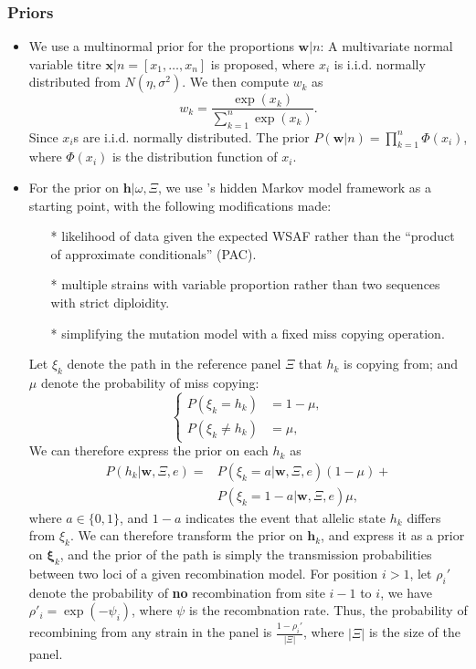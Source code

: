 \documentclass{bioinfo}
\begin{document}
\subsubsection{Priors}\label{sec:prior}
\begin{itemize}
\item We use a multinormal prior for the proportions $\mathbf{w}|n$: A multivariate normal variable titre ${\mathbf x}|n = [x_1,\dots,x_n]$ is proposed, where $x_i$ is i.i.d. normally distributed from $N(\eta, \sigma^2)$. We then compute $w_k$ as
$$w_k = \frac{\exp(x_k)}{\sum_{k=1}^n \exp(x_k)}.$$ Since $x_i$s are i.i.d. normally distributed. The prior $P(\mathbf{w}|n) = \displaystyle\prod_{k=1}^n \Phi(x_i)$, where $\Phi(x_i)$ is the distribution function of $x_i$.


\item For the prior on $\mathbf{h} | \omega, \Xi$, we use \citet{Li2003}'s hidden Markov model framework as a starting point, with the following modifications made:
\begin{itemize}
\item[*] likelihood of data given the expected WSAF rather than the ``product of approximate conditionals'' (PAC).
\item[*] multiple strains with variable proportion rather than two sequences with strict diploidity.
\item[*] simplifying the mutation model with a fixed miss copying operation.
\end{itemize}

Let $\xi_k$ denote the path in the reference panel $\Xi$ that $h_k$ is copying from; and $\mu$ denote the probability of miss copying:
$$\begin{cases}
P(\xi_k = h_k) &= 1-\mu, \\
P(\xi_k \neq h_k) &= \mu,\end{cases}$$
We can therefore express the prior on each $h_k$ as
\begin{equation}
\begin{split}
P (h_k|\mathbf{w}, \Xi, e) = & P (\xi_k = a|\mathbf{w}, \Xi, e) (1-\mu) +\\
                             & P (\xi_k = 1-a|\mathbf{w}, \Xi, e) \mu,
\end{split}\label{eqn:prior_on_h}
\end{equation}
where $a \in \{0, 1\}$, and $1-a$ indicates the event that allelic state $h_k$ differs from $\xi_k$. We can therefore transform the prior on $\mathbf{h}_k$, and express it as a prior on $\mathbf{\xi}_k$, and the prior of the path is simply the transmission probabilities between two loci of a given recombination model. For position $i > 1$, let $\rho_i'$ denote the probability of {\bf no} recombination from site $i-1$ to $i$, we have $\rho'_i = \exp(-\psi_i)$, where $\psi$ is the recombnation rate. Thus, the probability of recombining from any strain in the panel is $\displaystyle\frac{1-\rho_i'}{|\Xi|}$, where $|\Xi|$ is the size of the panel.

\end{itemize}
\end{document}

